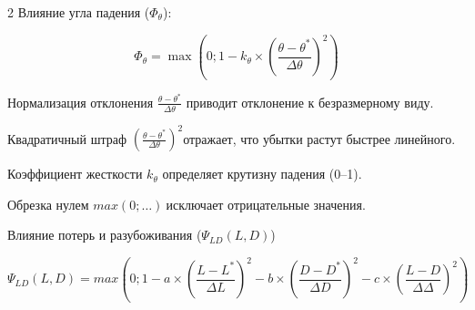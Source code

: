 \begin{multicols}{2}
Влияние угла падения (\(\Phi_{\theta}\)):

\begin{equation}
\Phi_{\theta} = \max\left( 0;1 - k_{\theta} \times \left( \frac{\theta - \theta^{*}}{\Delta \theta} \right)^{2} \right)
\end{equation}

Нормализация отклонения
\(\frac{\theta - \theta^{*}}{\Delta \theta}\) приводит
отклонение к безразмерному виду.

Квадратичный штраф
\(\left( \frac{\theta - \theta^{*}}{\Delta \theta} \right)^{2}\)отражает,
что убытки растут быстрее линейного.

Коэффициент жесткости \(k_{\theta}\) определяет крутизну падения (0--1).

Обрезка нулем \({max}(0;\ldots)\ \)исключает отрицательные значения.

Влияние потерь и разубоживания (\(\Psi_{LD}(L,D)\))
\end{multicols}

\begin{equation}
\Psi_{LD}(L,D) = {max}\left( 0;1 - a \times \left( \frac{L - L^{*}}{\Delta L} \right)^{2} - b \times \left( \frac{D - D^{*}}{\Delta D} \right)^{2} - c \times \left( \frac{L - D}{\Delta \Delta } \right)^{2} \right)
\end{equation}

